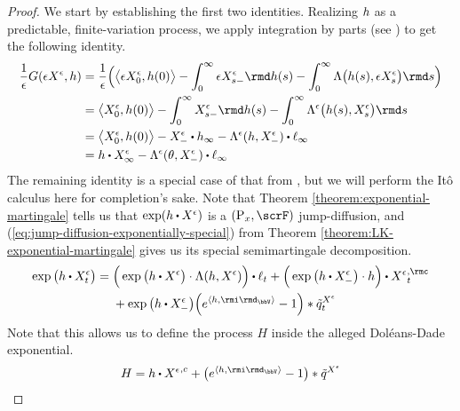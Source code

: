 \begin{proof}
  We start by establishing the first two identities.
  Realizing $h$ as a predictable, finite-variation process, we apply integration by parts (see \cite[Proposition I.4.49(b)]{jacod2003}) to get the following identity.
  \begin{align*}
    \frac1\epsilon \mgRf(\Xe, \twistFunc)
    &= \frac1\epsilon \Big( \bprj{\Xe_0}{\twistFunc(0)} - \int_0^\infty \Xe_{s-} \rmd\twistFunc(s) - \int_0^\infty \ode\big( \twistFunc(s), \Xe_s \big) \rmd s \Big) \\
    &= \bprj{\Xee_0}{\twistFunc(0)} - \int_0^\infty \Xee_{s-} \rmd\twistFunc(s) - \int_0^\infty \ode^\epsilon\big( \twistFunc(s), \Xee_s \big) \rmd s \\
    &= \bprj{\Xee_0}{\twistFunc(0)} - \Xee_- \shortInt \twistFunc_\infty - \ode^\epsilon(\twistFunc, \Xee_-) \shortInt \leb_\infty \\
    &= \twistFunc \shortInt \Xee_\infty - \ode^\epsilon(\twistVar, \Xee_-) \shortInt \leb_\infty
  \end{align*}
  The remaining identity is a special case of that from \cite[Theorem III.7.24]{jacod2003}, but we will perform the It\^o calculus here for completion's sake.
  Note that Theorem \ref{theorem:exponential-martingale} tells us that $\exp(\twistFunc \shortInt \Xee)$ is a $(\Prb_\stateVar, \scrF)$ jump-diffusion, and (\ref{eq:jump-diffusion-exponentially-special}) from Theorem \ref{theorem:LK-exponential-martingale} gives us its special semimartingale decomposition.
  \begin{equation*}
    \exp\big( \twistFunc \shortInt \Xee_t \big) 
    = \begin{aligned}[t]
      &\Big(\exp\big( \twistFunc \shortInt \Xee \big) \cdot \ode(\twistFunc, \Xee) \Big) \shortInt \leb_t + \Big( \exp\big( \twistFunc \shortInt \Xee_- \big) \cdot \twistFunc \Big) \shortInt {\Xee}^{,\rmc}_t \\
      &+ \exp\big(\twistFunc\shortInt\Xee_-\big) \Big( e^{\prj{\twistFunc}{\id_\vecSpace}} - 1 \Big) \ast \compensate{\jumpMeas^{\Xee}}_t
    \end{aligned} 
  \end{equation*}
  Note that this allows us to define the process $H$ inside the alleged Dol\'eans-Dade exponential.
  \begin{equation*}
    H = \twistFunc \shortInt {\Xee}^{,c} + \big( e^\prj{\twistFunc}{\id_\vecSpace} - 1 \big) \ast \compensate{\jumpMeas^{\Xee}}
  \end{equation*}

\end{proof}
